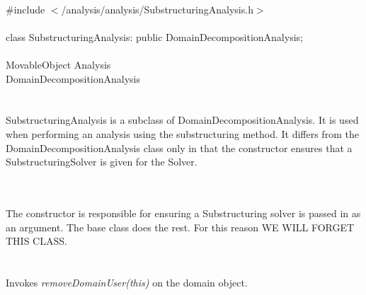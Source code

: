 
   \\
\indent \#include $<$/analysis/analysis/SubstructuringAnalysis.h$>$  \\

  \\
\indent class SubstructuringAnalysis: public DomainDecompositionAnalysis;  \\

 \\
\indent MovableObject
\indent Analysis \\
\indent\indent DomainDecompositionAnalysis \\
\indent\indent{} \\

 \\ 
\indent SubstructuringAnalysis is a subclass of DomainDecompositionAnalysis.
It is used when performing an analysis using the substructuring method.
It differs from the DomainDecompositionAnalysis class only in that the
constructor ensures that a SubstructuringSolver is given for the Solver.

 \\
 \\

The constructor is responsible for ensuring a Substructuring solver is
passed in as an argument. The base class does the rest. For this reason
WE WILL FORGET THIS CLASS. \\


 \\
\\ 
Invokes {\em removeDomainUser(this)} on the domain object. \\

\\

 \\













